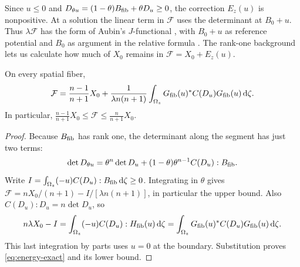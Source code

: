 Since $u\le0$ and $D_{\theta u}=(1-\theta)B_{\rm fib}+\theta D_u\ge0$,
the correction $E_z(u)$ is nonpositive. At a solution the linear
term in $\mathcal F$ uses the determinant at $B_0+u$. Thus
$\lambda\mathcal F$ has the form of Aubin's $J$-functional
\cite[p.~145]{Aubin1984}, with $B_0+u$ as reference potential and $B_0$
as argument in the relative formula \cite[Section~2.1]{BBGZ2013}.
The rank-one background lets us calculate how much of $X_0$ remains
in $\mathcal F=X_0+E_z(u)$.

\begin{lemma}\label{lem:energy-comparison}
On every spatial fiber,
\begin{equation}\label{eq:energy-exact}
 \mathcal F=\frac{n-1}{n+1}X_0+
   \frac{1}{\lambda n(n+1)}
   \int_{\Omega_z}G_{\rm fib}(u)^*C(D_u)G_{\rm fib}(u)\,\mathrm d\zeta .
\end{equation}
In particular,
$\frac{n-1}{n+1}X_0\le\mathcal F\le\frac{n}{n+1}X_0$.
\end{lemma}

\begin{proof}
Because $B_{\rm fib}$ has rank one, the determinant along the segment
has just two terms:
\[
 \det D_{\theta u}=\theta^n\det D_u+
    (1-\theta)\theta^{n-1} C(D_u):B_{\rm fib}.
\]
Write $I=\int_{\Omega_z}(-u) C(D_u):B_{\rm fib}\,\mathrm d\zeta\ge0$.
Integrating in $\theta$ gives
$\mathcal F=nX_0/(n+1)-I/[\lambda n(n+1)]$, in particular the upper
bound. Also $C(D_u):D_u=n\det D_u$, so
\[
 n\lambda X_0-I
   =\int_{\Omega_z}(-u)C(D_u):H_{\rm fib}(u)\,\mathrm d\zeta
   =\int_{\Omega_z}G_{\rm fib}(u)^*C(D_u)G_{\rm fib}(u)\,\mathrm d\zeta .
\]
This last integration by parts uses $u=0$ at the boundary. Substitution
proves \eqref{eq:energy-exact} and its lower bound.
\end{proof}
